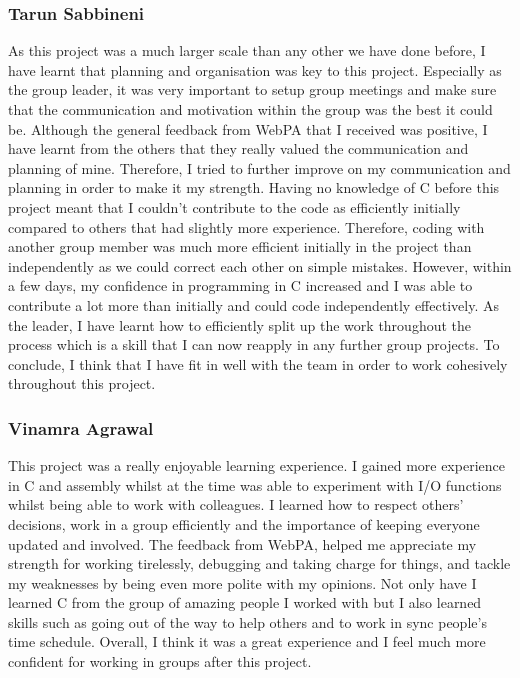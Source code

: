 \documentclass[11pt]{article}
\begin{document}
\subsubsection{Tarun Sabbineni}
As this project was a much larger scale than any other we have done before, I have learnt that planning and organisation was key to this project. Especially as the group leader, it was very important to setup group meetings and make sure that the communication and motivation within the group was the best it could be. Although the general feedback from WebPA that I received was positive, I have learnt from the others that they really valued the communication and planning of mine. Therefore, I tried to further improve on my communication and planning in order to make it my strength. Having no knowledge of C before this project meant that I couldn't contribute to the code as efficiently initially compared to others that had slightly more experience. Therefore, coding with another group member was much more efficient initially in the project than independently as we could correct each other on simple mistakes. However, within a few days, my confidence in programming in C increased and I was able to contribute a lot more than initially and could code independently effectively. As the leader, I have learnt how to efficiently split up the work throughout the process which is a skill that I can now reapply in any further group projects. To conclude, I think that I have fit in well with the team in order to work cohesively throughout this project. 

\subsubsection{Vinamra Agrawal}
This project was a really enjoyable learning experience. I gained more experience in C and assembly whilst at the time was able to experiment with I/O functions whilst being able to work with colleagues. I learned how to respect others' decisions, work in a group efficiently and the importance of keeping everyone updated and involved. The feedback from WebPA, helped me appreciate my  strength for working tirelessly, debugging and taking charge for things, and tackle my weaknesses by being even more polite with my opinions. Not only have I learned C from the group of amazing people I worked with but I also learned skills such as going out of the way to help others and to work in sync people's time schedule.  Overall, I think it was a great experience and I feel much more confident for working in groups after this project.
\end{document}
